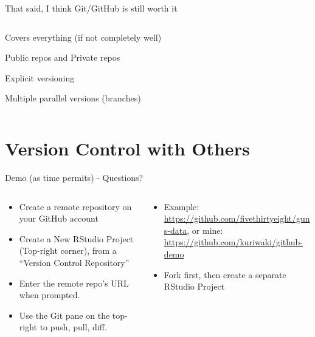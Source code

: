 \documentclass[ignorenonframetext, 10pt, aspectratio=169]{beamer}
\begin{document}
\begin{frame}{That said, I think Git/GitHub is still worth it}
\begin{columns}[T]
\begin{column}{0.6\textwidth}
\begin{wideitemize}
\item Covers everything (if not completely well)
\item Public repos and Private repos
\item Explicit versioning
\item Multiple parallel versions (branches) 
\end{wideitemize}
\end{column}
\end{columns}
\end{frame}

\section{Version Control with Others}


\begin{frame}{Demo (as time permits) - Questions?}
\begin{columns}[T]
\begin{column}{0.5\textwidth}
\begin{itemize}
\item Create a remote repository on your GitHub account
\item Create a New RStudio Project (Top-right corner), from a ``Version Control Repository''
\item Enter the remote repo's URL when prompted. 
\item Use the Git pane on the top-right to push, pull, diff.
\end{itemize}
\end{column}
\begin{column}{0.5\textwidth}

\begin{itemize}
\item Example: \url{https://github.com/fivethirtyeight/guns-data}, or mine: \url{https://github.com/kuriwaki/github-demo}
\item Fork first, then create a separate RStudio Project
\end{itemize}
\end{column}
\end{columns}
\end{frame}
\end{document}
